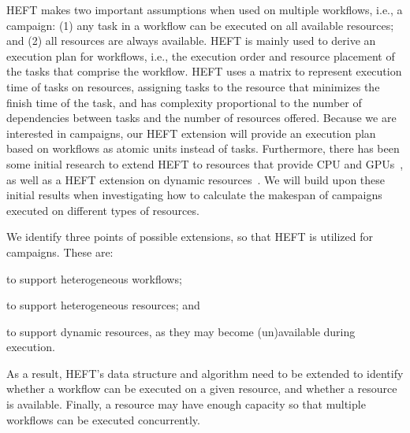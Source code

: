 HEFT makes two important assumptions when used on multiple workflows, i.e., a campaign: (1) any task in a workflow can be executed on all available resources; and (2) all resources are always available.
HEFT is mainly used to derive an execution plan for workflows, i.e., the execution order and resource placement of the tasks that comprise the workflow.
HEFT uses a matrix to represent execution time of tasks on resources, assigning tasks to the resource that minimizes the finish time of the task, and has complexity proportional to the number of dependencies between tasks and the number of resources offered. 
Because we are interested in campaigns, our HEFT extension will provide an execution plan based on workflows as atomic units instead of tasks.
Furthermore, there has been some initial research to extend HEFT to resources that provide CPU and GPUs~\cite{shetti2013optimization}, as well as a HEFT extension on dynamic resources~\cite{dong2007pfas}. 
We will build upon these initial results when investigating how to calculate the makespan of campaigns executed on different types of resources.

We identify three points of possible extensions, so that HEFT is utilized for campaigns.
These are:
\begin{inparaenum}[(i)]
    \item to support heterogeneous workflows;
    \item to support heterogeneous resources; and
    \item to support dynamic resources, as they may become (un)available during execution.
\end{inparaenum}
As a result, HEFT's data structure and algorithm need to be extended to identify whether a workflow can be executed on a given resource, and whether a resource is available.
Finally, a resource may have enough capacity so that multiple workflows can be executed concurrently.

